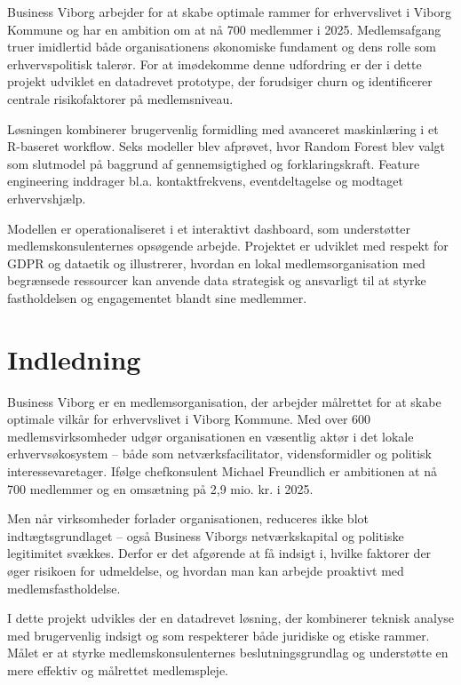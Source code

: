 \documentclass[
  11pt,
  letterpaper,
  DIV=11,
  numbers=noendperiod]{scrartcl}
\begin{document}
Business Viborg arbejder for at skabe optimale rammer for erhvervslivet
i Viborg Kommune og har en ambition om at nå 700 medlemmer i 2025.
Medlemsafgang truer imidlertid både organisationens økonomiske fundament
og dens rolle som erhvervspolitisk talerør. For at imødekomme denne
udfordring er der i dette projekt udviklet en datadrevet prototype, der
forudsiger churn og identificerer centrale risikofaktorer på
medlemsniveau.

Løsningen kombinerer brugervenlig formidling med avanceret maskinlæring
i et R-baseret workflow. Seks modeller blev afprøvet, hvor Random Forest
blev valgt som slutmodel på baggrund af gennemsigtighed og
forklaringskraft. Feature engineering inddrager bl.a. kontaktfrekvens,
eventdeltagelse og modtaget erhvervshjælp.

Modellen er operationaliseret i et interaktivt dashboard, som
understøtter medlemskonsulenternes opsøgende arbejde. Projektet er
udviklet med respekt for GDPR og dataetik og illustrerer, hvordan en
lokal medlemsorganisation med begrænsede ressourcer kan anvende data
strategisk og ansvarligt til at styrke fastholdelsen og engagementet
blandt sine medlemmer.

\section{Indledning}\label{indledning}

Business Viborg er en medlemsorganisation, der arbejder målrettet for at
skabe optimale vilkår for erhvervslivet i Viborg Kommune. Med over 600
medlemsvirksomheder udgør organisationen en væsentlig aktør i det lokale
erhvervsøkosystem -- både som netværksfacilitator, vidensformidler og
politisk interessevaretager. Ifølge chefkonsulent Michael Freundlich er
ambitionen at nå 700 medlemmer og en omsætning på 2,9 mio. kr. i 2025.

Men når virksomheder forlader organisationen, reduceres ikke blot
indtægtsgrundlaget -- også Business Viborgs netværkskapital og politiske
legitimitet svækkes. Derfor er det afgørende at få indsigt i, hvilke
faktorer der øger risikoen for udmeldelse, og hvordan man kan arbejde
proaktivt med medlemsfastholdelse.

I dette projekt udvikles der en datadrevet løsning, der kombinerer
teknisk analyse med brugervenlig indsigt og som respekterer både
juridiske og etiske rammer. Målet er at styrke medlemskonsulenternes
beslutningsgrundlag og understøtte en mere effektiv og målrettet
medlemspleje.
\end{document}
